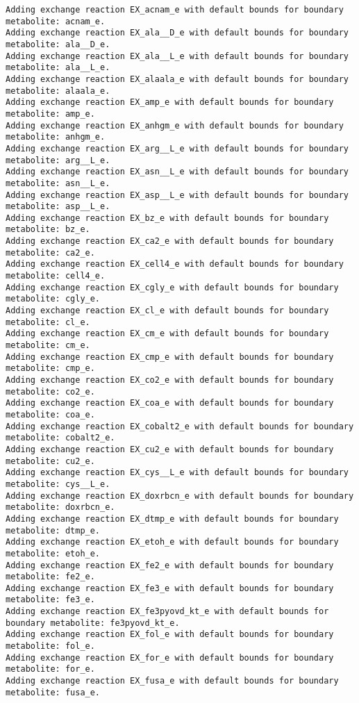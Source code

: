 \documentclass[
  letterpaper,
  DIV=11,
  numbers=noendperiod]{scrartcl}
\begin{document}
\begin{verbatim}
Adding exchange reaction EX_acnam_e with default bounds for boundary metabolite: acnam_e.
Adding exchange reaction EX_ala__D_e with default bounds for boundary metabolite: ala__D_e.
Adding exchange reaction EX_ala__L_e with default bounds for boundary metabolite: ala__L_e.
Adding exchange reaction EX_alaala_e with default bounds for boundary metabolite: alaala_e.
Adding exchange reaction EX_amp_e with default bounds for boundary metabolite: amp_e.
Adding exchange reaction EX_anhgm_e with default bounds for boundary metabolite: anhgm_e.
Adding exchange reaction EX_arg__L_e with default bounds for boundary metabolite: arg__L_e.
Adding exchange reaction EX_asn__L_e with default bounds for boundary metabolite: asn__L_e.
Adding exchange reaction EX_asp__L_e with default bounds for boundary metabolite: asp__L_e.
Adding exchange reaction EX_bz_e with default bounds for boundary metabolite: bz_e.
Adding exchange reaction EX_ca2_e with default bounds for boundary metabolite: ca2_e.
Adding exchange reaction EX_cell4_e with default bounds for boundary metabolite: cell4_e.
Adding exchange reaction EX_cgly_e with default bounds for boundary metabolite: cgly_e.
Adding exchange reaction EX_cl_e with default bounds for boundary metabolite: cl_e.
Adding exchange reaction EX_cm_e with default bounds for boundary metabolite: cm_e.
Adding exchange reaction EX_cmp_e with default bounds for boundary metabolite: cmp_e.
Adding exchange reaction EX_co2_e with default bounds for boundary metabolite: co2_e.
Adding exchange reaction EX_coa_e with default bounds for boundary metabolite: coa_e.
Adding exchange reaction EX_cobalt2_e with default bounds for boundary metabolite: cobalt2_e.
Adding exchange reaction EX_cu2_e with default bounds for boundary metabolite: cu2_e.
Adding exchange reaction EX_cys__L_e with default bounds for boundary metabolite: cys__L_e.
Adding exchange reaction EX_doxrbcn_e with default bounds for boundary metabolite: doxrbcn_e.
Adding exchange reaction EX_dtmp_e with default bounds for boundary metabolite: dtmp_e.
Adding exchange reaction EX_etoh_e with default bounds for boundary metabolite: etoh_e.
Adding exchange reaction EX_fe2_e with default bounds for boundary metabolite: fe2_e.
Adding exchange reaction EX_fe3_e with default bounds for boundary metabolite: fe3_e.
Adding exchange reaction EX_fe3pyovd_kt_e with default bounds for boundary metabolite: fe3pyovd_kt_e.
Adding exchange reaction EX_fol_e with default bounds for boundary metabolite: fol_e.
Adding exchange reaction EX_for_e with default bounds for boundary metabolite: for_e.
Adding exchange reaction EX_fusa_e with default bounds for boundary metabolite: fusa_e.

\end{verbatim}
\end{document}
